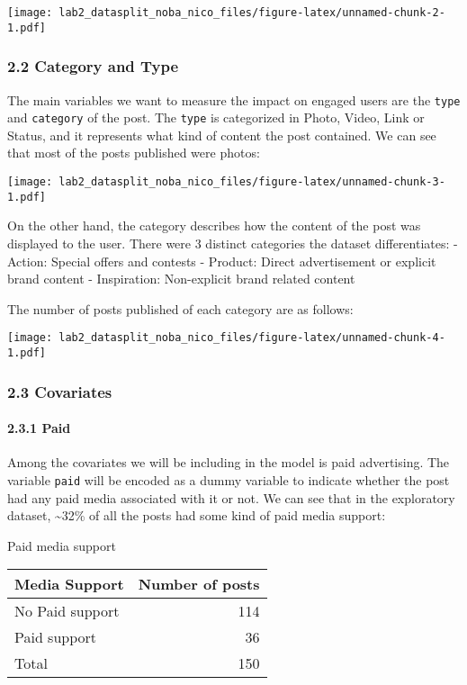 \documentclass[
]{article}
\begin{document}
\texttt{[image: lab2\_datasplit\_noba\_nico\_files/figure-latex/unnamed-chunk-2-1.pdf]}

\hypertarget{category-and-type}{%
\subsubsection{2.2 Category and Type}\label{category-and-type}}

The main variables we want to measure the impact on engaged users are
the \texttt{type} and \texttt{category} of the post. The \texttt{type}
is categorized in Photo, Video, Link or Status, and it represents what
kind of content the post contained. We can see that most of the posts
published were photos:

\texttt{[image: lab2\_datasplit\_noba\_nico\_files/figure-latex/unnamed-chunk-3-1.pdf]}

On the other hand, the category describes how the content of the post
was displayed to the user. There were 3 distinct categories the dataset
differentiates: - Action: Special offers and contests - Product: Direct
advertisement or explicit brand content - Inspiration: Non-explicit
brand related content

The number of posts published of each category are as follows:

\texttt{[image: lab2\_datasplit\_noba\_nico\_files/figure-latex/unnamed-chunk-4-1.pdf]}

\hypertarget{covariates}{%
\subsubsection{2.3 Covariates}\label{covariates}}

\hypertarget{paid}{%
\paragraph{2.3.1 Paid}\label{paid}}

Among the covariates we will be including in the model is paid
advertising. The variable \texttt{paid} will be encoded as a dummy
variable to indicate whether the post had any paid media associated with
it or not. We can see that in the exploratory dataset,
\textasciitilde32\% of all the posts had some kind of paid media
support:

\begin{center}
  Paid media support
\end{center}

\begin{center}
  \begin{tabular}{l r}
    \hline
    Media Support   & Number of posts \\
    \hline
    No Paid support & 114             \\
    Paid support    & 36             \\
    \hline
    Total           & 150             \\
    \hline
  \end{tabular}
\end{center}
\end{document}
